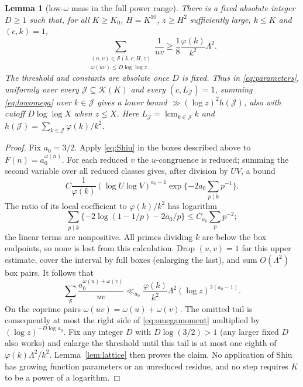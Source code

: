 \documentclass[10pt,reqno]{amsart}
\newtheorem{lemma}[theorem]{Lemma}
\theoremstyle{remark}
\newcommand{\K}{\mathcal K}
\newcommand{\J}{\mathcal J}
\newcommand{\Sset}{\mathcal S}
\newcommand{\lcm}{\operatorname{lcm}}
\begin{document}
\begin{lemma}[low-$\omega$ mass in the full power range]\label{lem:omega}
There is a fixed absolute integer $D\geq1$ such that, for all $K\geq K_0$,
$H=K^{10}$, $z\geq H^2$ sufficiently large, $k\leq K$ and $(c,k)=1$,
\begin{equation}\label{eq:lowomega}
 \sum_{\substack{(u,v)\in\Sset(k,c;H,z)\\
                 \omega(uv)\leq D\log\log z}}\frac1{uv}
 \geq\frac18\frac{\varphi(k)}{k^2}\Lambda^2.
\end{equation}
The threshold and constants are absolute once $D$ is fixed.  Thus in
\eqref{eq:parameters}, uniformly over every $\J\subseteq\K(K)$ and every
$(c,L_{\J})=1$, summing \eqref{eq:lowomega} over $k\in\J$ gives a lower
bound $\gg(\log z)^2 h(\J)$, also with cutoff $D\log\log X$ when $z\leq X$.
Here $L_{\J}=\lcm_{k\in\J}k$ and $h(\J)=\sum_{k\in\J}\varphi(k)/k^2$.
\end{lemma}
\begin{proof}
Fix $a_0=3/2$.  Apply \eqref{eq:Shiu} in the boxes described above to
$F(n)=a_0^{\omega(n)}$.  For each reduced $v$ the $u$-congruence is
reduced; summing the second variable over all reduced classes gives,
after division by $UV$, a bound
\[
 C\frac1{\varphi(k)}(\log U\log V)^{a_0-1}
                    \exp\{-2a_0\sum_{p\mid k}p^{-1}\}.
\]
The ratio of its local coefficient to $\varphi(k)/k^2$ has logarithm
\[
 \sum_{p\mid k}\{-2\log(1-1/p)-2a_0/p\}
 \leq C_{a_0}\sum_p p^{-2};
\]
the linear terms are nonpositive.  All primes dividing $k$ are below the
box endpoints, so none is lost from this calculation.  Drop $(u,v)=1$
for this upper estimate, cover the interval by full boxes (enlarging the
last), and sum $O(\Lambda^2)$ box pairs.  It follows that
\begin{equation}\label{eq:omegamoment}
 \sum_{\Sset}\frac{a_0^{\omega(u)+\omega(v)}}{uv}
 \ll_{a_0}\frac{\varphi(k)}{k^2}\Lambda^2
                       (\log z)^{2(a_0-1)}.
\end{equation}
On the coprime pairs $\omega(uv)=\omega(u)+\omega(v)$.  The omitted tail
is consequently at most the right side of \eqref{eq:omegamoment}
multiplied by $(\log z)^{-D\log a_0}$.  Fix any integer $D$ with
$D\log(3/2)>1$ (any larger fixed $D$ also works) and enlarge the threshold until this tail is at most
one eighth of $\varphi(k)\Lambda^2/k^2$.
Lemma~\ref{lem:lattice} then proves the claim.  No application of Shiu
has growing function parameters or an unreduced residue, and no step
requires $K$ to be a power of a logarithm.
\end{proof}
\end{document}
